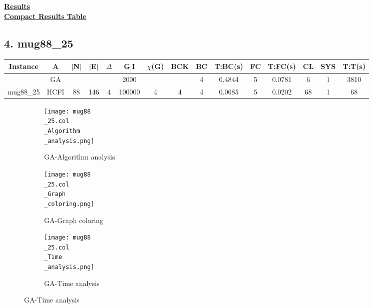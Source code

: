 \documentclass[10pt]{article}
\begin{document}
\vspace{2cm}
\begin{center}
\hyperlink{page.8}{\textbf{Results}}\\
\vspace{0.5cm}
\hyperlink{page.71}{\textbf{Compact Results Table}}
\end{center}
\pagebreak

\subsection*{\hspace{0,9073976cm} 4. mug88\_25}
\begin{table}[H]
\centering
\begin{tabular}{|c|c|c|c|c|c|c|c|c|c|c|c|c|c|c|}
\hline
Instance& A &$|$N$|$ & $|$E$|$ & $\Delta$ & G$|$I & $\chi$(G) &BCK&BC & T:BC(s) & FC & T:FC(s) & CL & SYS & T:T(s) \\ \hline \hline
 	&GA&       &                   &                     &2000         &     \cellcolor{yellow} & {\cellcolor{yellow}}& {{\cellcolor{green}4}}
&0.4844    &5        &0.0781                   &6                    &1          &3810        \\ \cline{2-2} \cline{6-6} \cline{9-15}
 \multirow{-2}{*}{mug88\_25} &HCFI   &\multirow{-2}{*}{88}   &\multirow{-2}{*}{146}     &\multirow{-2}{*}{4}     &100000     &\multirow{-2}{*}{\cellcolor{yellow}4}      & \multirow{-2}{*}{\cellcolor{yellow}4}    &{\cellcolor{green}4}     &0.0685          &5    & 0.0202         &68    &    1 &68        \\ \hline 
\end{tabular}
\end{table}
\graphicspath{{./Core1/Solutions/GA/mug88\_25.col}}
\begin{figure}[H]
\begin{subfigure}{.33\textwidth}
  \centering
  \texttt{[image: mug88\\\_25.col\\\_Algorithm\\\_analysis.png]}
  \caption{GA-Algorithm analysis}
   \label{fig:subfig1}
\end{subfigure}%
\begin{subfigure}{.33\textwidth}
  \centering
  \texttt{[image: mug88\\\_25.col\\\_Graph\\\_coloring.png]}
  \caption{GA-Graph coloring}
  \label{fig:subfig2}
\end{subfigure}
\begin{subfigure}{.33\textwidth}
  \centering
  \texttt{[image: mug88\\\_25.col\\\_Time\\\_analysis.png]}
  \caption{GA-Time analysis}
  \end{subfigure}
\end{figure}
\end{document}
